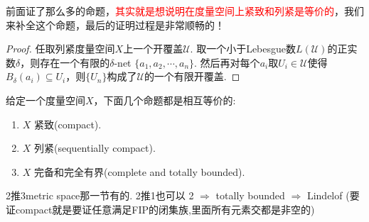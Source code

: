 前面证了那么多的命题，\textcolor{red}{其实就是想说明在度量空间上紧致和列紧是等价的}，我们来补全这个命题，最后的证明过程是非常顺畅的！

\begin{proof}
任取列紧度量空间$X$上一个开覆盖$\mathcal{U}$. 取一个小于Lebesgue数$L(\mathcal{U})$的正实数$\delta$，则存在一个有限的$\delta$-net $\{a_1,a_2,\cdots,a_n\}$. 然后再对每个$a_i$取$U_i \in \mathcal{U}$使得$B_\delta(a_i) \subseteq U_i$，则$\{U_n\}$构成了$\mathcal{U}$的一个有限开覆盖.
\end{proof}

\begin{proposition}
给定一个度量空间$X$，下面几个命题都是相互等价的:
\begin{enumerate}
	\item $X$ 紧致(compact).
	\item $X$ 列紧(sequentially compact).
	\item $X$ 完备和完全有界(complete and totally bounded).
\end{enumerate}

2推3metric space那一节有的. 2推1也可以 2 $\Rightarrow$ totally bounded $\Rightarrow$ Lindelof (要证compact就是要证任意满足FIP的闭集族,里面所有元素交都是非空的)
\end{proposition}

